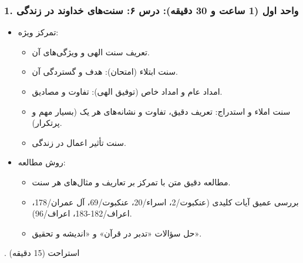 \documentclass{article}
\begin{document}
\subsubsection*{1. واحد اول (1 ساعت و 30 دقیقه): درس ۶: سنت‌های خداوند در زندگی}
\begin{itemize}
    \item تمرکز ویژه:
    \begin{itemize}
        \item تعریف سنت الهی و ویژگی‌های آن.
        \item سنت ابتلاء (امتحان): هدف و گستردگی آن.
        \item امداد عام و امداد خاص (توفیق الهی): تفاوت و مصادیق.
        \item سنت املاء و استدراج: تعریف دقیق، تفاوت و نشانه‌های هر یک (بسیار مهم و پرتکرار).
        \item سنت تأثیر اعمال در زندگی.
    \end{itemize}
    \item روش مطالعه:
    \begin{itemize}
        \item مطالعه دقیق متن با تمرکز بر تعاریف و مثال‌های هر سنت.
        \item بررسی عمیق آیات کلیدی (عنکبوت/2، اسراء/20، عنکبوت/69، آل عمران/178، اعراف/182-183، اعراف/96).
        \item حل سؤالات «تدبر در قرآن» و «اندیشه و تحقیق».
    \end{itemize}
\end{itemize}

\vspace{\baselineskip}
. استراحت (15 دقیقه)
\vspace{\baselineskip}
\end{document}
